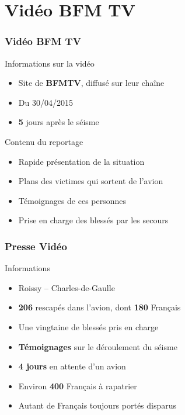 \section{Vidéo BFM TV}
\begin{frame}
\frametitle{Vidéo BFM TV}
  \begin{block}{Informations sur la vidéo}
    \begin{itemize}
      \item{Site de \textbf{BFMTV}, diffusé sur leur chaîne}
      \item{Du 30/04/2015}
      \item{\textbf{5} jours après le séisme}
    \end{itemize}
  \end{block} \pause
  
  \begin{block}{Contenu du reportage}
    \begin{itemize}
      \item{Rapide présentation de la situation}
      \item{Plans des victimes qui sortent de l'avion}
      \item{Témoignages de ces personnes}
      \item{Prise en charge des blessés par les secours}
    \end{itemize}
  \end{block}
\end{frame}

\begin{frame}
\frametitle{Presse Vidéo}
  \begin{block}{Informations}
    \begin{itemize}
      \item{Roissy -- Charles-de-Gaulle}
      \item{\textbf{206} rescapés dans l'avion, dont \textbf{180} Français}
      \item{Une vingtaine de blessés pris en charge} \pause
      \item{\textbf{Témoignages} sur le déroulement du séisme}
      \item{\textbf{4 jours} en attente d'un avion} \pause
      \item{Environ \textbf{400} Français à rapatrier}
      \item{Autant de Français toujours portés disparus}
    \end{itemize}
  \end{block}
\end{frame}

